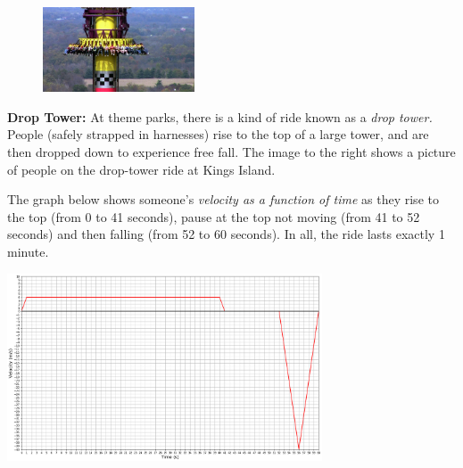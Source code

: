 \documentclass[addpoints,12pt]{exam}
\begin{document}
\begin{questions}
\begin{minipage}{\linewidth}
\begin{figure}
	\vspace{-20pt}
	\begin{center}\includegraphics[width=0.4\textwidth]{../images/drop_tower_image.jpg}\end{center}
	\vspace{-20pt}
\end{figure}

\question \textbf{Drop Tower:} At theme parks, there is a kind of ride known as a \textit{drop tower.} People (safely strapped in harnesses) rise to the top of a large tower, and are then dropped down to experience free fall. The image to the right shows a picture of people on the drop-tower ride at Kings Island.

The graph below shows someone's \textit{velocity as a function of time} as they rise to the top (from 0 to 41 seconds), pause at the top not moving (from 41 to 52 seconds) and then falling (from 52 to 60 seconds). In all, the ride lasts exactly 1 minute.

\noindent\begin{center}
\includegraphics[width=0.7\textwidth]{../images/test1V1_dropTower.png}
\end{center}

\end{minipage}
\end{questions}
\end{document}
